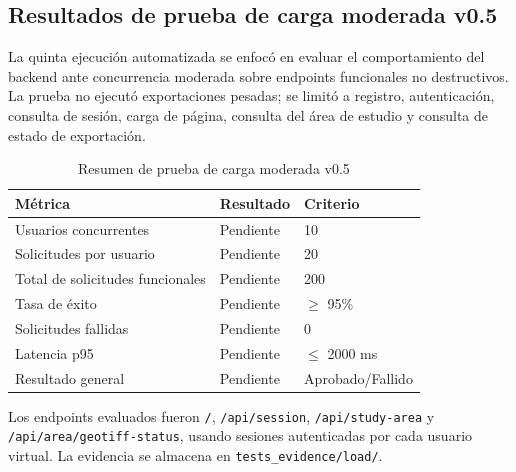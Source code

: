 
\subsection{Resultados de prueba de carga moderada v0.5}

La quinta ejecución automatizada se enfocó en evaluar el comportamiento del backend
ante concurrencia moderada sobre endpoints funcionales no destructivos. La prueba no
ejecutó exportaciones pesadas; se limitó a registro, autenticación, consulta de sesión,
carga de página, consulta del área de estudio y consulta de estado de exportación.

\begin{table}[H]
\centering
\begin{tabular}{|p{4.5cm}|p{4cm}|p{4cm}|}
\hline
\textbf{Métrica} & \textbf{Resultado} & \textbf{Criterio} \\
\hline
Usuarios concurrentes & Pendiente & 10 \\
\hline
Solicitudes por usuario & Pendiente & 20 \\
\hline
Total de solicitudes funcionales & Pendiente & 200 \\
\hline
Tasa de éxito & Pendiente & $\geq$ 95\% \\
\hline
Solicitudes fallidas & Pendiente & 0 \\
\hline
Latencia p95 & Pendiente & $\leq$ 2000 ms \\
\hline
Resultado general & Pendiente & Aprobado/Fallido \\
\hline
\end{tabular}
\caption{Resumen de prueba de carga moderada v0.5}
\end{table}

Los endpoints evaluados fueron \texttt{/}, \texttt{/api/session}, \texttt{/api/study-area}
y \texttt{/api/area/geotiff-status}, usando sesiones autenticadas por cada usuario virtual.
La evidencia se almacena en \texttt{tests\_evidence/load/}.
